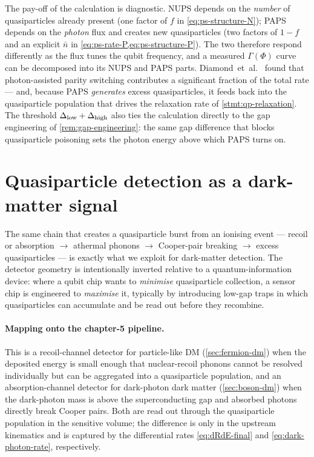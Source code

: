 \begin{remark}
\label{rem:parity-flux}
The pay-off of the calculation is diagnostic. NUPS depends on the
\emph{number} of quasiparticles already present (one factor of $f$
in \cref{eq:ps-structure-N}); PAPS depends on the \emph{photon}
flux and creates new quasiparticles (two factors of $1-f$ and an
explicit $\bar n$ in \cref{eq:ps-rate-P,eq:ps-structure-P}). The
two therefore respond differently as the flux tunes the qubit
frequency, and a measured $\Gamma(\Phi)$ curve can be decomposed
into its NUPS and PAPS parts. Diamond~et~al.~\cite{diamond2022}
found that photon-assisted parity switching contributes a
significant fraction of the total rate --- and, because PAPS
\emph{generates} excess quasiparticles, it feeds back into the
quasiparticle population that drives the relaxation rate of
\cref{stmt:qp-relaxation}. The threshold
$\Delta_{\rm low}+\Delta_{\rm high}$ also ties the calculation
directly to the gap engineering of \cref{rem:gap-engineering}: the
same gap difference that blocks quasiparticle poisoning sets the
photon energy above which PAPS turns on.
\end{remark}

\section{Quasiparticle detection as a dark-matter signal}
\label{sec:qp-dm}

\begin{phenomenon}
The same chain that creates a quasiparticle burst from an ionising
event --- recoil or absorption $\to$ athermal phonons $\to$
Cooper-pair breaking $\to$ excess quasiparticles --- is exactly
what we exploit for dark-matter detection. The detector geometry
is intentionally inverted relative to a quantum-information
device: where a qubit chip wants to \emph{minimise} quasiparticle
collection, a sensor chip is engineered to \emph{maximise} it,
typically by introducing low-gap traps in which quasiparticles
can accumulate and be read out before they recombine.
\end{phenomenon}

\paragraph{Mapping onto the chapter-5 pipeline.}
This is a recoil-channel detector for particle-like DM
(\cref{sec:fermion-dm}) when the deposited energy is small enough
that nuclear-recoil phonons cannot be resolved individually but
can be aggregated into a quasiparticle population, and an
absorption-channel detector for dark-photon dark matter
(\cref{sec:boson-dm}) when the dark-photon mass is above the
superconducting gap and absorbed photons directly break Cooper
pairs.  Both are read out through the quasiparticle population
in the sensitive volume; the difference is only in the upstream
kinematics and is captured by the differential rates
\cref{eq:dRdE-final} and \cref{eq:dark-photon-rate}, respectively.

